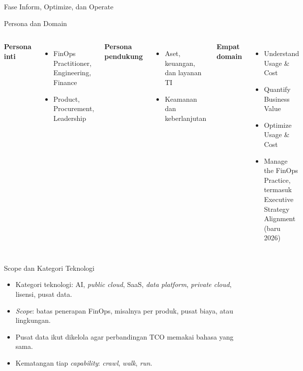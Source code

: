 \documentclass[aspectratio=169, table, 12pt]{beamer}
\begin{document}
\begin{frame}{{\Large Fase Inform, Optimize, dan Operate}}
  \centering
\end{frame}

\begin{frame}{{\Large Persona dan Domain}}
  \begin{columns}[t]
    \small
    \textbf{Persona inti}
    \begin{itemize}
      \item FinOps Practitioner, Engineering, Finance
      \item Product, Procurement, Leadership
    \end{itemize}
    \textbf{Persona pendukung}
    \begin{itemize}
      \item Aset, keuangan, dan layanan TI
      \item Keamanan dan keberlanjutan
    \end{itemize}

    \small
    \textbf{Empat domain}
    \begin{itemize}
      \item Understand Usage \& Cost
      \item Quantify Business Value
      \item Optimize Usage \& Cost
      \item Manage the FinOps Practice, termasuk Executive Strategy Alignment
            (baru 2026)
    \end{itemize}
  \end{columns}
\end{frame}

\begin{frame}{{\Large Scope dan Kategori Teknologi}}
  \vspace{10pt}
  \begin{itemize}
    \item Kategori teknologi: AI, \textit{public cloud}, SaaS, \textit{data
          platform}, \textit{private cloud}, lisensi, pusat data.
    \item \textit{Scope}: batas penerapan FinOps, misalnya per produk, pusat
          biaya, atau lingkungan.
    \item Pusat data ikut dikelola agar perbandingan TCO memakai bahasa yang
          sama.
    \item Kematangan tiap \textit{capability}: \textit{crawl}, \textit{walk},
          \textit{run}.
  \end{itemize}
\end{frame}
\end{document}
